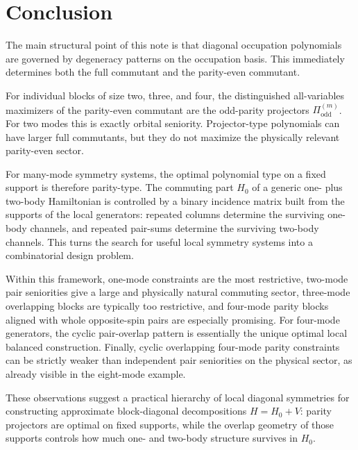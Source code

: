 \documentclass[11pt]{article}
\newcommand{\odd}{\mathrm{odd}}
\theoremstyle{definition}
\theoremstyle{remark}
\begin{document}
\section{Conclusion}
The main structural point of this note is that diagonal occupation polynomials are governed by degeneracy patterns on the occupation basis. This immediately determines both the full commutant and the parity-even commutant.

For individual blocks of size two, three, and four, the distinguished all-variables maximizers of the parity-even commutant are the odd-parity projectors $\Pi^{(m)}_{\odd}$. For two modes this is exactly orbital seniority. Projector-type polynomials can have larger full commutants, but they do not maximize the physically relevant parity-even sector.

For many-mode symmetry systems, the optimal polynomial type on a fixed support is therefore parity-type. The commuting part $H_0$ of a generic one- plus two-body Hamiltonian is controlled by a binary incidence matrix built from the supports of the local generators: repeated columns determine the surviving one-body channels, and repeated pair-sums determine the surviving two-body channels. This turns the search for useful local symmetry systems into a combinatorial design problem.

Within this framework, one-mode constraints are the most restrictive, two-mode pair seniorities give a large and physically natural commuting sector, three-mode overlapping blocks are typically too restrictive, and four-mode parity blocks aligned with whole opposite-spin pairs are especially promising. For four-mode generators, the cyclic pair-overlap pattern is essentially the unique optimal local balanced construction. Finally, cyclic overlapping four-mode parity constraints can be strictly weaker than independent pair seniorities on the physical sector, as already visible in the eight-mode example.

These observations suggest a practical hierarchy of local diagonal symmetries for constructing approximate block-diagonal decompositions $H=H_0+V$: parity projectors are optimal on fixed supports, while the overlap geometry of those supports controls how much one- and two-body structure survives in $H_0$.
\end{document}

